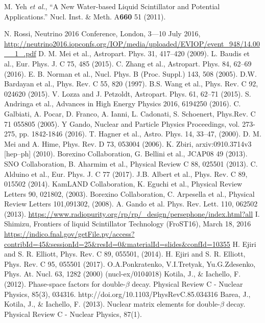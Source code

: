 \documentclass[11pt,prd,letterpaper,amsmath,amssymb,final,nofootinbib
,unsortedaddress,superscriptaddress
]{revtex4-1}
\begin{document}
\begin{thebibliography}{00}

M. Yeh {\it et al.}, { ``A New Water-based Liquid Scintillator and Potential Applications.''} 
Nucl. Inst. \& Meth. A{\bf 660} 51 (2011).


 N. Rossi, Neutrino 2016 Conference, London, 3---10 July 2016, \url{http://neutrino2016.iopconfs.org/IOP/media/uploaded/EVIOP/event_948/14.00__1_.pdf}
 D. M. Mei et al., Astropart. Phys. 31, 417–420 (2009).
 L. Baudis et al., Eur. Phys. J. C 75, 485 (2015).
 C. Zhang et al., Astropart. Phys. 84, 62--69 (2016).
 E. B. Norman et al., Nucl. Phys. B (Proc. Suppl.) 143, 508 (2005).
 D.W. Bardayan et al., Phys. Rev. C 55, 820 (1997).
 B.S. Wang et al., Phys. Rev. C 92, 024620 (2015).
  V. Lozza and J. Petzoldt, Astropart. Phys. 61, 62--71 (2015).
 S. Andringa et al., Advances in High Energy Physics 2016, 6194250 (2016).
 C. Galbiati, A. Pocar, D. Franco, A. Ianni, L. Cadonati, S. Schoenert, Phys.Rev. C 71 055805 (2005).
 Y Gando, Nuclear and Particle Physics Proceedings, vol. 273- 275, pp. 1842-1846 (2016).
 T. Hagner et al., Astro. Phys. 14, 33--47, (2000).
 D. M. Mei and A. Hime, Phys. Rev. D 73, 053004 (2006).
 K. Zbiri, arxiv:0910.3714v3 [hep--ph] (2010).
 Borexino Collaboration, G. Bellini et al., JCAP08 49 (2013).
 SNO Collaboration, B. Aharmim et al., Physical Review C 88, 025501 (2013).
 C. Alduino et al., Eur. Phys. J. C 77 (2017).
  J.B. Albert et al., Phys. Rev. C 89, 015502 (2014). 
 KamLAND Collaboration, K. Eguchi et al., Physical Review Letters 90, 021802, (2003).
 Borexino Collaboration, C. Arpesella et al., Physical Review Letters 101,091302, (2008).
 A. Gando et al. Phys. Rev. Lett. 110, 062502 (2013).
 \url{https://www.radiopurity.org/rp/rp/_design/persephone/index.html?all}
 I. Shimizu, Frontiers of liquid Scintillator Technology (FroST16), March 18, 2016
\url{https://indico.fnal.gov/getFile.py/access?contribId=45&sessionId=25&resId=0&materialId=slides&confId=10355}
 H. Ejiri and S. R. Elliott, Phys. Rev. C 89, 055501, (2014).
 H. Ejiri and S. R. Elliott, Phys. Rev. C 95, 055501 (2017).
 O.A.Ponkratenko, V.I.Tretyak, Yu.G.Zdesenko, Phys. At. Nucl. 63, 1282   (2000)  (nucl-ex/0104018)
 Kotila, J., \& Iachello, F. (2012). Phase-space factors for double-$\beta$ decay. Physical Review C - Nuclear Physics, 85(3), 034316. http://doi.org/10.1103/PhysRevC.85.034316
 Barea, J., Kotila, J., \& Iachello, F. (2013). Nuclear matrix elements for double-$\beta$ decay. Physical Review C - Nuclear Physics, 87(1).

\end{thebibliography}




\end{document}
